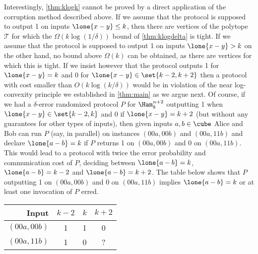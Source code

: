 Interestingly, \autoref{thm:klogk} cannot be proved by a direct 
application of the corruption method described above. 
If we assume that the protocol
is supposed to output 1 on inputs $\lone{x-y}\le k$, then there are 
vertices of the polytope $\mathcal{T}$ for which 
the $\Omega(k\log(1/\delta))$ bound of 
\autoref{thm:klogdelta} is tight. If we assume that the protocol
is supposed to output 1 on inputs $\lone{x-y}> k$ on the other
hand, no bound above $\Omega(k)$ can be obtained, as there are
vertices for which this is tight.
If we insist however that the protocol outputs 1 for $\lone{x-y}=k$
and 0 for $\lone{x-y}\in\set{k-2,k+2}$ then a protocol with cost
smaller than $O(k\log (k/\delta))$
would be in violation of the near log-convexity principle we 
established in \autoref{thm:main} as we argue next.
Of course, if we had a $\delta$-error randomized protocol 
$P$ for 
$\Ham^{n+2}_k$ outputting 1 when $\lone{x-y}\in\set{k-2,k}$ 
and 0 if $\lone{x-y}=k+2$ 
(but without any guarantees for other types of inputs), then 
given inputs $a,b\in\cube$ Alice and Bob can run $P$
(say, in parallel)
on instances $(00a, 00b)$ and $(00a, 11b)$ and declare 
$\lone{a-b}=k$ if $P$ returns 1 on $(00a, 00b)$ and 
0 on $(00a, 11b)$.
This would lead to a protocol with twice the error probability
and communication cost of $P$, deciding between $\lone{a-b}=k$,
$\lone{a-b}=k-2$ and $\lone{a-b}=k+2$. The table below shows that
$P$ outputting 1 on $(00a, 00b)$ and 0 on $(00a, 11b)$ implies
$\lone{a-b}=k$ or at least one invocation of $P$ erred.

\begin{center}
\def\arraystretch{1.2}
\begin{tabular}{rccc}
Input       & $k-2$ & $k$  & $k+2$ \\\hline
$(00a,00b)$ &   1   &  1   &  0  \\
$(00a,11b)$ &   1   &  0   &  ? 
\end{tabular}
\end{center}

